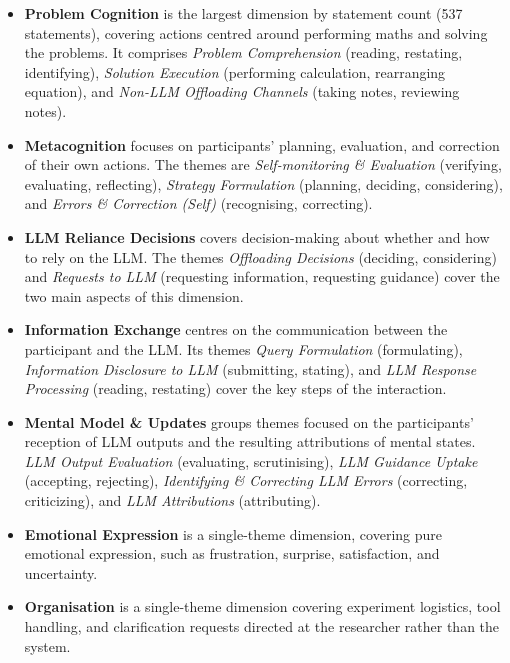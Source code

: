 \begin{itemize}
    \item \textbf{Problem Cognition} is the largest dimension by statement count (537 statements), covering actions centred around performing maths and solving the problems. It comprises \textit{Problem Comprehension} (reading, restating, identifying), \textit{Solution Execution} (performing calculation, rearranging equation), and \textit{Non-LLM Offloading Channels} (taking notes, reviewing notes).
    \item \textbf{Metacognition} focuses on participants' planning, evaluation, and correction of their own actions. The themes are \textit{Self-monitoring \& Evaluation} (verifying, evaluating, reflecting), \textit{Strategy Formulation} (planning, deciding, considering), and \textit{Errors \& Correction (Self)} (recognising, correcting).
    \item \textbf{LLM Reliance Decisions} covers decision-making about whether and how to rely on the \ac{LLM}. The themes \textit{Offloading Decisions} (deciding, considering) and \textit{Requests to LLM} (requesting information, requesting guidance) cover the two main aspects of this dimension.
    \item \textbf{Information Exchange} centres on the communication between the participant and the \ac{LLM}. Its themes \textit{Query Formulation} (formulating), \textit{Information Disclosure to LLM} (submitting, stating), and \textit{LLM Response Processing} (reading, restating) cover the key steps of the interaction.
    \item \textbf{Mental Model \& Updates} groups themes focused on the participants' reception of \ac{LLM} outputs and the resulting attributions of mental states. \textit{LLM Output Evaluation} (evaluating, scrutinising), \textit{LLM Guidance Uptake} (accepting, rejecting), \textit{Identifying \& Correcting LLM Errors} (correcting, criticizing), and \textit{LLM Attributions} (attributing).
    \item \textbf{Emotional Expression} is a single-theme dimension, covering pure emotional expression, such as frustration, surprise, satisfaction, and uncertainty.
    \item \textbf{Organisation} is a single-theme dimension covering experiment logistics, tool handling, and clarification requests directed at the researcher rather than the system.
\end{itemize}


